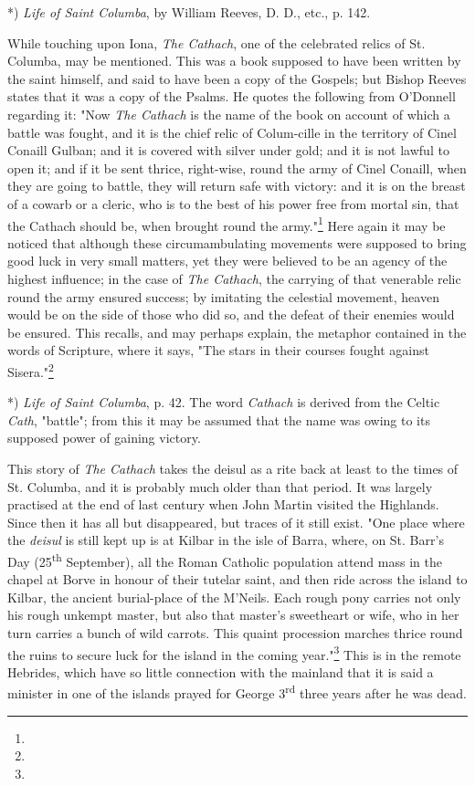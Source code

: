 \documentclass[a4paper, 11pt, oneside, polutonikogreek, english]{article}
\begin{document}
*) \emph{Life of Saint Columba}, by William Reeves, D. D., etc., p. 142.

While touching upon Iona, \emph{The Cathach}, one of the celebrated relics of St. Columba, may be mentioned. This was a book supposed to have been written by the saint himself, and said to have been a copy of the Gospels; but Bishop Reeves states that it was a copy of the Psalms. He quotes the following from O'Donnell regarding it: "Now \emph{The Cathach} is the name of the book on account of which a battle was fought, and it is the chief relic of Colum-cille in the territory of Cinel Conaill Gulban; and it is covered with silver under gold; and it is not lawful to open it; and if it be sent thrice, right-wise, round the army of Cinel Conaill, when they are going to battle, they will return safe with victory: and it is on the breast of a cowarb or a cleric, who is to the best of his power free from mortal sin, that the Cathach should be, when brought round the army."\footnote{} Here again it may be noticed that although these circumambulating movements were supposed to bring good luck in very small matters, yet they were believed to be an agency of the highest influence; in the case of \emph{The Cathach}, the carrying of that venerable relic round the army ensured success; by imitating the celestial movement, heaven would be on the side of those who did so, and the defeat of their enemies would be ensured. This recalls, and may perhaps explain, the metaphor contained in the words of Scripture, where it says, "The stars in their courses fought against Sisera."\footnote{}

*) \emph{Life of Saint Columba}, p. 42. The word \emph{Cathach} is derived from the Celtic \emph{Cath}, "battle"; from this it may be assumed that the name was owing to its supposed power of gaining victory.

This story of \emph{The Cathach} takes the deisul as a rite back at least to the times of St. Columba, and it is probably much older than that period. It was largely practised at the end of last century when John Martin visited the Highlands. Since then it has all but disappeared, but traces of it still exist. "One place where the \emph{deisul} is still kept up is at Kilbar in the isle of Barra, where, on St. Barr's Day (25\textsuperscript{th} September), all the Roman Catholic population attend mass in the chapel at Borve in honour of their tutelar saint, and then ride across the island to Kilbar, the ancient burial-place of the M'Neils. Each rough pony carries not only his rough unkempt master, but also that master's sweetheart or wife, who in her turn carries a bunch of wild carrots. This quaint procession marches thrice round the ruins to secure luck for the island in the coming year."\footnote{} This is in the remote Hebrides, which have so little connection with the mainland that it is said a minister in one of the islands prayed for George 3\textsuperscript{rd} three years after he was dead.
\end{document}
